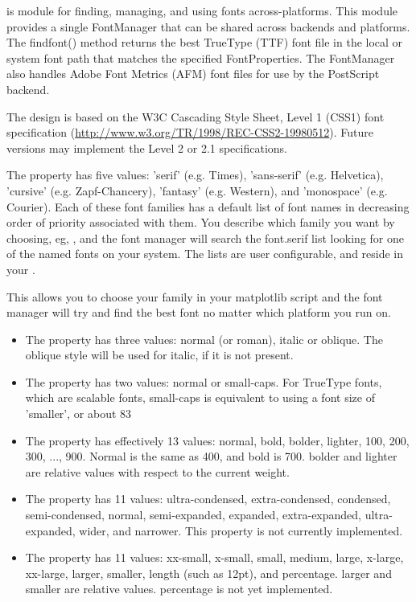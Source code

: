 \documentclass[]{book}
\begin{document}
 is module for finding,
managing, and using fonts across-platforms.  This module provides a
single FontManager that can be shared across backends and platforms.
The findfont() method returns the best TrueType (TTF) font file in the
local or system font path that matches the specified FontProperties.
The FontManager also handles Adobe Font Metrics (AFM) font files for
use by the PostScript backend.

The design is based on the W3C Cascading Style Sheet, Level 1 (CSS1)
font specification (\url{http://www.w3.org/TR/1998/REC-CSS2-19980512}).
Future versions may implement the Level 2 or 2.1 specifications.
      
The  property has five values: 'serif' (e.g. Times),
'sans-serif' (e.g. Helvetica), 'cursive' (e.g. Zapf-Chancery),
'fantasy' (e.g. Western), and 'monospace' (e.g. Courier).  Each of
these font families has a default list of font names in decreasing
order of priority associated with them.  You describe which family you
want by choosing, eg, , and the font manager will
search the font.serif list looking for one of the named fonts on your
system.  The lists are user configurable, and reside in your
.

This allows you to choose your family in your matplotlib script and
the font manager will try and find the best font no matter which
platform you run on.

\begin{itemize}
\item The  property has three values: normal (or
  roman), italic or oblique.  The oblique style will be used for
  italic, if it is not present.
  
\item The  property has two values: normal or
  small-caps.  For TrueType fonts, which are scalable fonts,
  small-caps is equivalent to
  using a font size of 'smaller', or about 83%
  
\item The  property has effectively 13 values: normal,
  bold, bolder, lighter, 100, 200, 300, ..., 900.  Normal is the same
  as 400, and bold is 700.  bolder and lighter are relative values
  with respect to the current weight.

  
\item The  property has 11 values: ultra-condensed,
  extra-condensed, condensed, semi-condensed, normal, semi-expanded,
  expanded, extra-expanded, ultra-expanded, wider, and narrower.  This
  property is not currently implemented.
  
\item The  property has 11 values: xx-small, x-small,
  small, medium, large, x-large, xx-large, larger, smaller, length
  (such as 12pt), and percentage.  larger and smaller are relative
  values.  percentage is not yet implemented.

\end{itemize}
\end{document}
